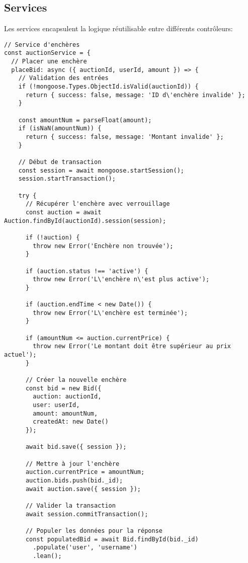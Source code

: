 \subsection{Services}
Les services encapsulent la logique réutilisable entre différents contrôleurs:

\begin{verbatim}
// Service d'enchères
const auctionService = {
  // Placer une enchère
  placeBid: async ({ auctionId, userId, amount }) => {
    // Validation des entrées
    if (!mongoose.Types.ObjectId.isValid(auctionId)) {
      return { success: false, message: 'ID d\'enchère invalide' };
    }
    
    const amountNum = parseFloat(amount);
    if (isNaN(amountNum)) {
      return { success: false, message: 'Montant invalide' };
    }
    
    // Début de transaction
    const session = await mongoose.startSession();
    session.startTransaction();
    
    try {
      // Récupérer l'enchère avec verrouillage
      const auction = await Auction.findById(auctionId).session(session);
      
      if (!auction) {
        throw new Error('Enchère non trouvée');
      }
      
      if (auction.status !== 'active') {
        throw new Error('L\'enchère n\'est plus active');
      }
      
      if (auction.endTime < new Date()) {
        throw new Error('L\'enchère est terminée');
      }
      
      if (amountNum <= auction.currentPrice) {
        throw new Error('Le montant doit être supérieur au prix actuel');
      }
      
      // Créer la nouvelle enchère
      const bid = new Bid({
        auction: auctionId,
        user: userId,
        amount: amountNum,
        createdAt: new Date()
      });
      
      await bid.save({ session });
      
      // Mettre à jour l'enchère
      auction.currentPrice = amountNum;
      auction.bids.push(bid._id);
      await auction.save({ session });
      
      // Valider la transaction
      await session.commitTransaction();
      
      // Populer les données pour la réponse
      const populatedBid = await Bid.findById(bid._id)
        .populate('user', 'username')
        .lean();
      

\end{verbatim}
